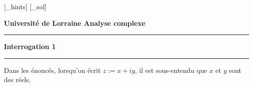 

\newcommand{\z}{\overline{z}}
\DeclareMathOperator{\PR}{\text{Ré}}
\DeclareMathOperator{\PI}{\text{Im}}
\DeclareMathOperator{\Log}{\text{Log}}
\newcommand{\vecteur}[2]{\begin{pmatrix}#1 \\ #2 \end{pmatrix}}







[\jobname_hints]
[\jobname_sol]



\newpage
\noindent \textbf{\textsf{Université de Lorraine \hfill Analyse complexe}}
\smallskip
\noindent\rule{\textwidth}{2pt}
\begin{center}
{\huge \textbf{Interrogation 1}}
\end{center}
\noindent\rule{\textwidth}{2pt}

Dans les énoncés, lorsqu'on écrit $z:=x+iy$, il est sous-entendu que $x$ et $y$ sont des réels.



